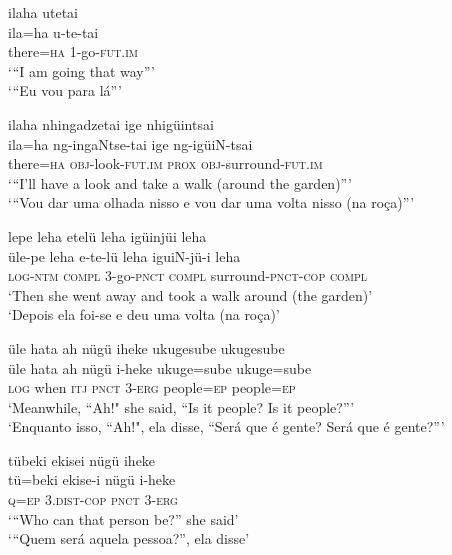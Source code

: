 \documentclass[output=paper,
modfonts,nonflat
]{langsci/langscibook}
\begin{document}
\ea ilaha utetai\\[.3em]
\gll ila=ha		u-te-tai\\
there=\textsc{ha} 	1-go-\textsc{fut.im} \\
\glt ‘“I am going that way”’\\
‘“Eu vou para lá”’\\
\z

\ea ilaha nhingadzetai ige nhigüintsai\\[.3em]
\gll ila=ha		ng-ingaNtse-tai	ige	ng-igüiN-tsai\\
there=\textsc{ha} 	\textsc{obj}-look-\textsc{fut.im} 		\textsc{prox} 	\textsc{obj}-surround-\textsc{fut.im} \\
\glt ‘“I’ll have a look and take a walk (around the garden)”’\\
‘“Vou dar uma olhada nisso e vou dar uma volta nisso (na roça)”’\\
\z

\ea lepe leha etelü leha igüinjüi leha\\[.3em]
\gll üle-pe		leha	e-te-lü		leha	iguiN-jü-i		leha\\
\textsc{log}-\textsc{ntm} 	\textsc{compl}	3-go-\textsc{pnct} 	\textsc{compl}	surround-\textsc{pnct-cop} 	\textsc{compl} \\
\glt ‘Then she went away and took a walk around (the garden)’\\
‘Depois ela foi-se e deu uma volta (na roça)’\\
\z

\ea üle hata ah nügü iheke ukugesube ukugesube \\[.3em]
\gll üle	hata	ah	nügü	i-heke	ukuge=sube	ukuge=sube{\footnotemark} \\
\textsc{log} 	when 	\textsc{itj} 	\textsc{pnct}	3-\textsc{erg}	people=\textsc{ep} 	people=\textsc{ep}\\
\glt ‘Meanwhile, “Ah!" she said, “Is it people? Is it people?”’\\
‘Enquanto isso, “Ah!", ela disse, “Será que é gente? Será que é gente?”’\\
\z 

\ea tübeki ekisei nügü iheke\\[.3em]
\gll tü=beki	ekise-i		nügü	i-heke\\
\textsc{q=ep} 		3.\textsc{dist-cop} 	\textsc{pnct} 	3-\textsc{erg} \\
\glt ‘“Who can that person be?” she said’\\
‘“Quem será aquela pessoa?”, ela disse’\\
\z
\end{document}
